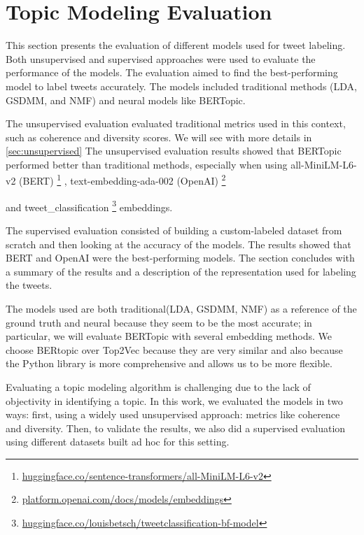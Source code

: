 \section{Topic Modeling Evaluation}

    \graphicspath{{Chapter4/Figures}{Chapter4/Figures}}

This section presents the evaluation of different models used for tweet labeling. Both unsupervised and supervised approaches were used to evaluate the performance of the models. 
The evaluation aimed to find the best-performing model to label tweets accurately. 
The models included traditional methods (LDA, GSDMM, and NMF) and neural models like  BERTopic. 

The unsupervised evaluation evaluated traditional metrics used in this context, such as coherence and diversity scores. We will see with more details in \ref{sec:unsupervised} The unsupervised evaluation results showed that BERTopic performed better than traditional methods, especially when using all-MiniLM-L6-v2 (BERT) \footnote{\href{https://huggingface.co/sentence-transformers/all-MiniLM-L6-v2}{huggingface.co/sentence-transformers/all-MiniLM-L6-v2}}
, text-embedding-ada-002 (OpenAI) \footnote{\href{https://platform.openai.com/docs/models/embeddings}{platform.openai.com/docs/models/embeddings}}

and tweet\_classification \footnote{\href{https://huggingface.co/louisbetsch/tweetclassification-bf-model}{huggingface.co/louisbetsch/tweetclassification-bf-model}} embeddings. 


The supervised evaluation consisted of building a custom-labeled dataset from scratch and then looking at the accuracy of the models. The results showed that BERT and OpenAI were the best-performing models. The section concludes with a summary of the results and a description of the representation used for labeling the tweets.

The models used are both traditional(LDA, GSDMM, NMF) as a reference of the ground truth and neural because they seem to be the most accurate; in particular, we will evaluate BERTopic with several embedding methods. We choose BERtopic over Top2Vec because they are very similar and also because the Python library is more comprehensive and allows us to be more flexible.

Evaluating a topic modeling algorithm is challenging due to the lack of objectivity in identifying a topic. In this work, we evaluated the models in two ways: first, using a widely used unsupervised approach: metrics like coherence and diversity. 
Then, to validate the results, we also did a supervised evaluation using different datasets built ad hoc for this setting.

